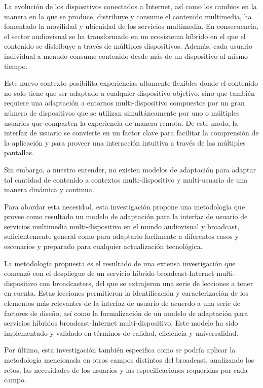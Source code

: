 \begin{resumen}        %

La evolución de los dispositivos conectados a Internet, así como los cambios en la manera en la que se produce, distribuye y consume el contenido multimedia, ha fomentado la movilidad y ubicuidad de los servicios multimedia. En consecuencia, el sector audiovisual se ha transformado en un ecosistema híbrido en el que el contenido se distribuye a través de múltiples dispositivos. Además, cada usuario individual a menudo consume contenido desde más de un dispositivo al mismo tiempo. 

Este nuevo contexto posibilita experiencias altamente flexibles donde el contenido no solo tiene que ser adaptado a cualquier dispositivo objetivo, sino que también requiere una adaptación a entornos multi-dispositivo compuestos por un gran número de dispositivos que se utilizan simultáneamente por uno o múltiples usuarios que comparten la experiencia de manera remota. De este modo, la interfaz de usuario se convierte en un factor clave para facilitar la comprensión de la aplicación y para proveer una interacción intuitiva a través de las múltiples pantallas. 

Sin embargo, a nuestro entender, no existen modelos de adaptación para adaptar tal cantidad de contenido a contextos multi-dispositivo y multi-usuario de una manera dinámica y continua. 

Para abordar esta necesidad, esta investigación propone una metodología que provee como resultado un modelo de adaptación para la interfaz de usuario de servicios multimedia multi-dispositivo en el mundo audiovisual y broadcast, suficientemente general como para adaptarlo facilmente a diferentes casos y escenarios y preparado para cualquier actualización tecnológica.  

La metodología propuesta es el resultado de una extensa investigación que comenzó con el despliegue de un servicio híbrido broadcast-Internet multi-dispositivo con broadcasters, del que se extrajeron una serie de \mbox{lecciones} a tener en cuenta. Estas lecciones permitieron la identificación y caracterización de los elementos más relevantes de la interfaz de usuario de acuerdo a una serie de factores de diseño, así como la formalización de un modelo de adaptación para servicios híbridos broadcast-Internet multi-dispositivo. Este \mbox{modelo} ha sido implementado y validado en términos de calidad, eficiencia y universalidad. 

Por último, esta investigación también especifica como se podría aplicar la metodología mencionada en otros campos distintos del broadcast, \mbox{analizando} los retos, las necesidades de los usuarios y las especificaciones requeridas por cada campo. 


\end{resumen}






